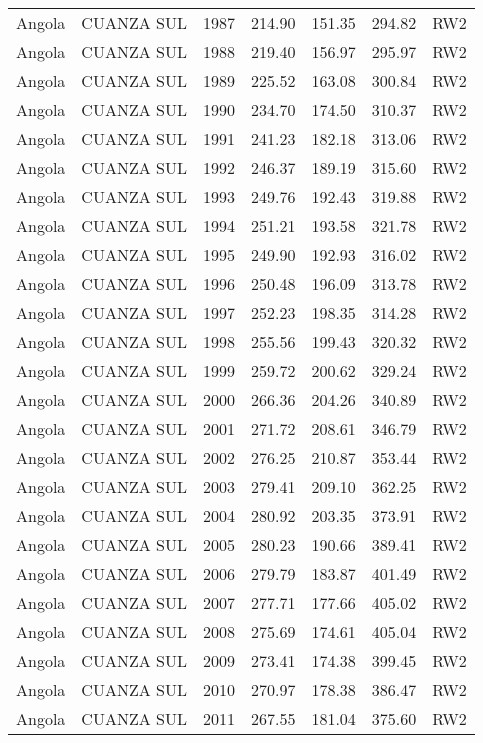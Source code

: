 \begin{longtable}{lllrrrl}
  Angola & CUANZA SUL & 1987 & 214.90 & 151.35 & 294.82 & RW2 \\ 
  Angola & CUANZA SUL & 1988 & 219.40 & 156.97 & 295.97 & RW2 \\ 
  Angola & CUANZA SUL & 1989 & 225.52 & 163.08 & 300.84 & RW2 \\ 
  Angola & CUANZA SUL & 1990 & 234.70 & 174.50 & 310.37 & RW2 \\ 
  Angola & CUANZA SUL & 1991 & 241.23 & 182.18 & 313.06 & RW2 \\ 
  Angola & CUANZA SUL & 1992 & 246.37 & 189.19 & 315.60 & RW2 \\ 
  Angola & CUANZA SUL & 1993 & 249.76 & 192.43 & 319.88 & RW2 \\ 
  Angola & CUANZA SUL & 1994 & 251.21 & 193.58 & 321.78 & RW2 \\ 
  Angola & CUANZA SUL & 1995 & 249.90 & 192.93 & 316.02 & RW2 \\ 
  Angola & CUANZA SUL & 1996 & 250.48 & 196.09 & 313.78 & RW2 \\ 
  Angola & CUANZA SUL & 1997 & 252.23 & 198.35 & 314.28 & RW2 \\ 
  Angola & CUANZA SUL & 1998 & 255.56 & 199.43 & 320.32 & RW2 \\ 
  Angola & CUANZA SUL & 1999 & 259.72 & 200.62 & 329.24 & RW2 \\ 
  Angola & CUANZA SUL & 2000 & 266.36 & 204.26 & 340.89 & RW2 \\ 
  Angola & CUANZA SUL & 2001 & 271.72 & 208.61 & 346.79 & RW2 \\ 
  Angola & CUANZA SUL & 2002 & 276.25 & 210.87 & 353.44 & RW2 \\ 
  Angola & CUANZA SUL & 2003 & 279.41 & 209.10 & 362.25 & RW2 \\ 
  Angola & CUANZA SUL & 2004 & 280.92 & 203.35 & 373.91 & RW2 \\ 
  Angola & CUANZA SUL & 2005 & 280.23 & 190.66 & 389.41 & RW2 \\ 
  Angola & CUANZA SUL & 2006 & 279.79 & 183.87 & 401.49 & RW2 \\ 
  Angola & CUANZA SUL & 2007 & 277.71 & 177.66 & 405.02 & RW2 \\ 
  Angola & CUANZA SUL & 2008 & 275.69 & 174.61 & 405.04 & RW2 \\ 
  Angola & CUANZA SUL & 2009 & 273.41 & 174.38 & 399.45 & RW2 \\ 
  Angola & CUANZA SUL & 2010 & 270.97 & 178.38 & 386.47 & RW2 \\ 
  Angola & CUANZA SUL & 2011 & 267.55 & 181.04 & 375.60 & RW2 \\ 

\end{longtable}
